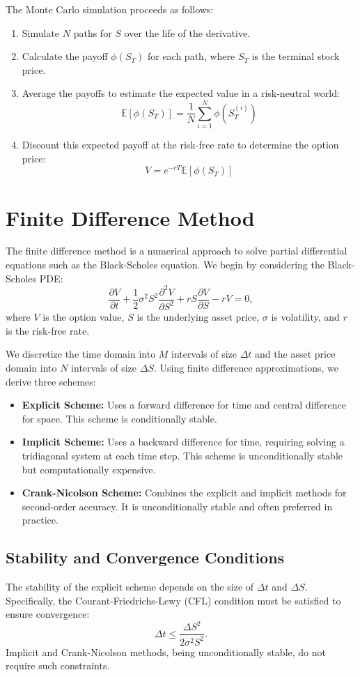 \documentclass[12pt,a4paper]{report}
\begin{document}
The Monte Carlo simulation proceeds as follows:
\begin{enumerate}
    \item Simulate \( N \) paths for \( S \) over the life of the derivative.
    \item Calculate the payoff \( \phi(S_T) \) for each path, where \( S_T \) is the terminal stock price.
    \item Average the payoffs to estimate the expected value in a risk-neutral world:
    \[
    \mathbb{E}[ \phi(S_T) ] = \frac{1}{N} \sum_{i=1}^N \phi(S_T^{(i)})
    \]
    \item Discount this expected payoff at the risk-free rate to determine the option price:
    \[
    V = e^{-rT} \mathbb{E}[ \phi(S_T) ]
    \]
\end{enumerate}

\section{Finite Difference Method}

The finite difference method is a numerical approach to solve partial differential equations such as the Black-Scholes equation. We begin by considering the Black-Scholes PDE:
\[
\frac{\partial V}{\partial t} + \frac{1}{2} \sigma^2 S^2 \frac{\partial^2 V}{\partial S^2} + rS \frac{\partial V}{\partial S} - rV = 0,
\]
where \( V \) is the option value, \( S \) is the underlying asset price, \( \sigma \) is volatility, and \( r \) is the risk-free rate.  

We discretize the time domain into \( M \) intervals of size \( \Delta t \) and the asset price domain into \( N \) intervals of size \( \Delta S \). Using finite difference approximations, we derive three schemes:

\begin{itemize}
    \item \textbf{Explicit Scheme:} Uses a forward difference for time and central difference for space. This scheme is conditionally stable.
    \item \textbf{Implicit Scheme:} Uses a backward difference for time, requiring solving a tridiagonal system at each time step. This scheme is unconditionally stable but computationally expensive.
    \item \textbf{Crank-Nicolson Scheme:} Combines the explicit and implicit methods for second-order accuracy. It is unconditionally stable and often preferred in practice.
\end{itemize}

\subsection{Stability and Convergence Conditions}
The stability of the explicit scheme depends on the size of \( \Delta t \) and \( \Delta S \). Specifically, the Courant-Friedrichs-Lewy (CFL) condition must be satisfied to ensure convergence:
\[
\Delta t \leq \frac{\Delta S^2}{2 \sigma^2 S^2}.
\]
Implicit and Crank-Nicolson methods, being unconditionally stable, do not require such constraints.
\end{document}
